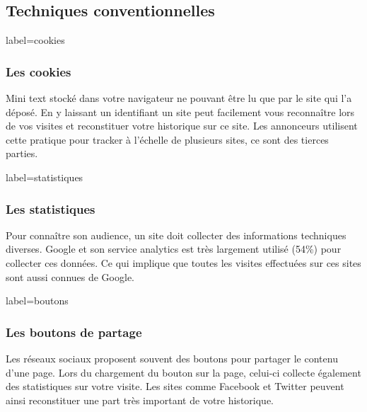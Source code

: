 \documentclass{beamer}
\begin{document}
    \subsection{Techniques conventionnelles}
        \begin{frame}{label=cookies}
            \frametitle{Les cookies}
            \begin{center}
                Mini text stocké dans votre navigateur ne pouvant être lu que par le site qui l'a déposé.
                En y laissant un identifiant un site peut facilement vous reconnaître lors de vos visites et reconstituer votre historique sur ce site.
                Les annonceurs utilisent cette pratique pour tracker à l'échelle de plusieurs sites, ce sont des tierces parties.
            \end{center}
        \end{frame}
        \begin{frame}{label=statistiques}
            \frametitle{Les statistiques}
            \begin{center}
                Pour connaître son audience, un site doit collecter des informations techniques diverses.
                Google et son service analytics est très largement utilisé (54\%) pour collecter ces données.
                Ce qui implique que toutes les visites effectuées sur ces sites sont aussi connues de Google.
            \end{center}
        \end{frame}
        \begin{frame}{label=boutons}
            \frametitle{Les boutons de partage}
            \begin{center}
                Les réseaux sociaux proposent souvent des boutons pour partager le contenu d'une page.
                Lors du chargement du bouton sur la page, celui-ci collecte également des statistiques sur votre visite.
                Les sites comme Facebook et Twitter peuvent ainsi reconstituer une part très important de votre historique.
            \end{center}
        \end{frame}
\end{document}
